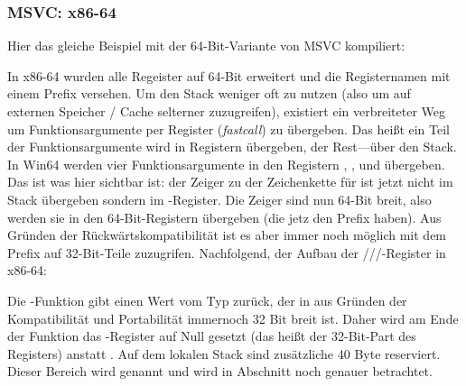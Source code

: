 \subsubsection{MSVC: x86-64}

Hier das gleiche Beispiel mit der 64-Bit-Variante von MSVC kompiliert:




In x86-64 wurden alle Regeister auf 64-Bit erweitert und die Registernamen mit einem Prefix versehen.
Um den Stack weniger oft zu nutzen (also um auf externen Speicher / Cache selterner zuzugreifen), existiert
ein verbreiteter Weg um Funktionsargumente per Register (\emph{fastcall})  zu übergeben.
Das heißt ein Teil der Funktionsargumente wird in Registern übergeben, der Rest---über den Stack.
In Win64 werden vier Funktionsargumente in den Registern \RCX, \RDX,  und  übergeben.
Das ist was hier sichtbar ist: der Zeiger zu der Zeichenkette für \printf ist jetzt nicht im Stack übergeben sondern im \RCX-Register.
Die Zeiger sind nun 64-Bit breit, also werden sie in den 64-Bit-Registern übergeben (die jetz den Prefix haben).
Aus Gründen der Rückwärtskompatibilität ist es aber immer noch möglich mit dem Prefix auf 32-Bit-Teile zuzugrifen.
Nachfolgend, der Aufbau der \RAX/\EAX/\AX/\AL-Register in x86-64:


Die \main-Funktion gibt einen Wert vom Typ \Tint{} zurück, der in \CCpp aus Gründen der Kompatibilität und
Portabilität immernoch 32 Bit breit ist. Daher wird am Ende der Funktion das \EAX-Register auf Null gesetzt
(das heißt der 32-Bit-Part des Registers) anstatt \RAX{}.
Auf dem lokalen Stack sind zusätzliche 40 Byte reserviert.
Dieser Bereich wird  genannt und wird in Abschnitt  noch genauer betrachtet.
